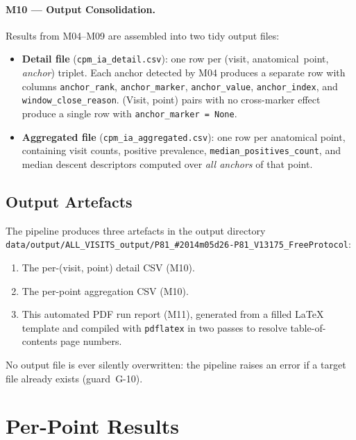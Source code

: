 \documentclass[a4paper,11pt]{article}
\begin{document}
\paragraph{M10 --- Output Consolidation.}
Results from M04--M09 are assembled into two tidy output files:
\begin{itemize}
  \item \textbf{Detail file} (\texttt{cpm\_ia\_detail.csv}): one row per
        (visit, anatomical~point, \emph{anchor}) triplet. Each anchor detected by M04
        produces a separate row with columns \texttt{anchor\_rank},
        \texttt{anchor\_marker}, \texttt{anchor\_value}, \texttt{anchor\_index},
        and \texttt{window\_close\_reason}.
        (Visit, point) pairs with no cross-marker effect produce a single row with
        \texttt{anchor\_marker = None}.
  \item \textbf{Aggregated file} (\texttt{cpm\_ia\_aggregated.csv}): one row per
        anatomical point, containing visit counts, positive prevalence,
        \texttt{median\_positives\_count}, and median descent descriptors computed over
        \emph{all anchors} of that point.
\end{itemize}

\subsection{Output Artefacts}

The pipeline produces three artefacts in the output directory \texttt{data/output/ALL\_VISITS\_output/P81\_\#2014m05d26-P81\_V13175\_FreeProtocol}:
\begin{enumerate}
  \item The per-(visit, point) detail CSV (M10).
  \item The per-point aggregation CSV (M10).
  \item This automated PDF run report (M11), generated from a filled \LaTeX{} template
        and compiled with \texttt{pdflatex} in two passes to resolve table-of-contents
        page numbers.
\end{enumerate}
No output file is ever silently overwritten: the pipeline raises an error if a target
file already exists (guard~G-10).

\section{Per-Point Results}
\end{document}
